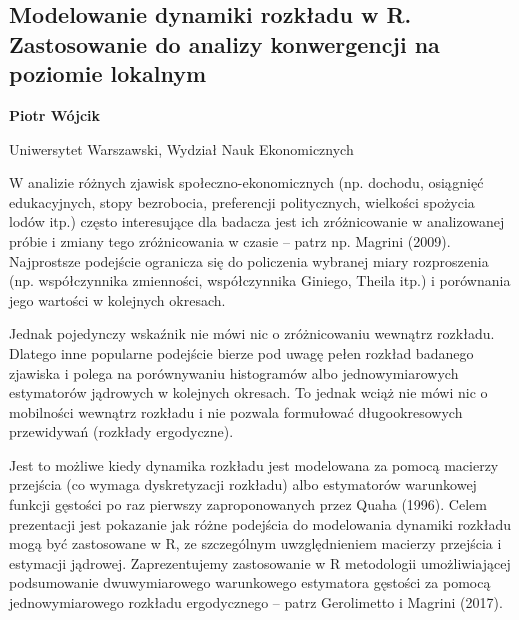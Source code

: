 \documentclass[\main/boa.tex]{subfiles}
\begin{document}
\subsection{Modelowanie dynamiki rozkładu w R. Zastosowanie do analizy konwergencji na poziomie lokalnym}

\begin{minipage}{0.915\textwidth}
	\centering
  {\bf {} Piotr Wójcik}
\end{minipage}

\vskip 0.3cm

\begin{affiliations}
\begin{minipage}{0.915\textwidth}
\centering
Uniwersytet Warszawski, Wydział Nauk Ekonomicznych  \\[-2pt]
\end{minipage}
\end{affiliations}

\vskip 0.8cm

  W analizie różnych zjawisk społeczno-ekonomicznych (np. dochodu, osiągnięć edukacyjnych, stopy bezrobocia, preferencji politycznych, wielkości spożycia lodów itp.) często interesujące dla badacza jest ich zróżnicowanie w analizowanej próbie i zmiany tego zróżnicowania w czasie – patrz np. Magrini (2009). Najprostsze podejście ogranicza się do policzenia wybranej miary rozproszenia (np. współczynnika zmienności, współczynnika Giniego, Theila itp.) i porównania jego wartości w kolejnych okresach.
  
  Jednak pojedynczy wskaźnik nie mówi nic o zróżnicowaniu wewnątrz rozkładu. Dlatego inne popularne podejście bierze pod uwagę pełen rozkład badanego zjawiska i polega na porównywaniu histogramów albo jednowymiarowych estymatorów jądrowych w kolejnych okresach. To jednak wciąż nie mówi nic o mobilności wewnątrz rozkładu i nie pozwala formułować długookresowych przewidywań (rozkłady ergodyczne).
  
  Jest to możliwe kiedy dynamika rozkładu jest modelowana za pomocą macierzy przejścia (co wymaga dyskretyzacji rozkładu) albo estymatorów warunkowej funkcji gęstości po raz pierwszy zaproponowanych przez Quaha (1996). Celem prezentacji jest pokazanie jak różne podejścia do modelowania dynamiki rozkładu mogą być zastosowane w R, ze szczególnym uwzględnieniem macierzy przejścia i estymacji jądrowej. Zaprezentujemy zastosowanie w R metodologii umożliwiającej podsumowanie dwuwymiarowego warunkowego estymatora gęstości za pomocą jednowymiarowego rozkładu ergodycznego – patrz Gerolimetto i Magrini (2017).
  
\end{document}
